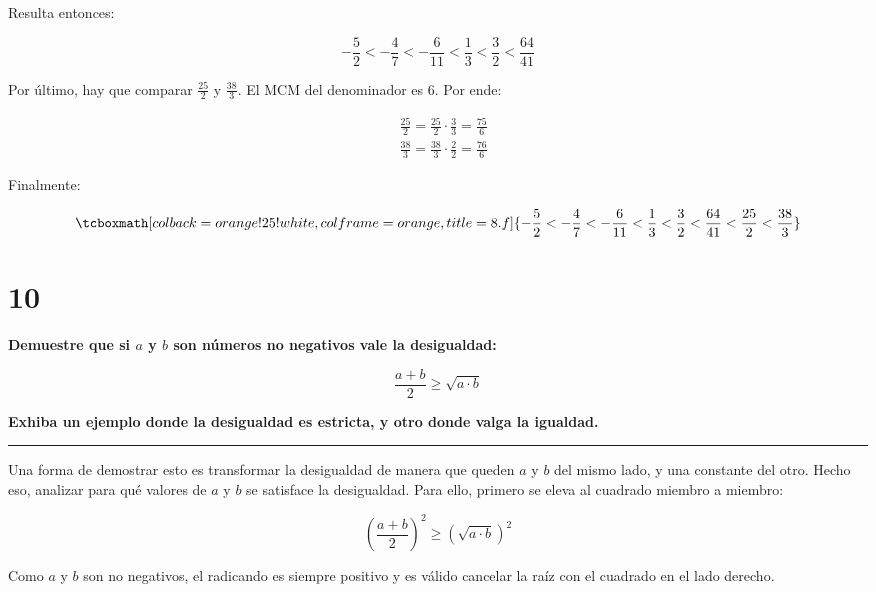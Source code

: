 \documentclass{article}
\newcommand{\hresult}[2]{\tcboxmath[colback=orange!25!white,colframe=orange, title=#1] {#2} }
\begin{document}
Resulta entonces:

\begin{equation}
-\frac{5}{2} < -\frac{4}{7} < -\frac{6}{11} < \frac{1}{3} < \frac{3}{2} < \frac{64}{41}
\end{equation}

Por último, hay que comparar $\frac{25}{2}$ y $\frac{38}{3}$. El MCM del denominador es 6. Por ende:

\begin{subequations} 
\begin{align}
& \frac{25}{2} = \frac{25}{2} \cdot \frac{3}{3} = \frac{75}{6} \\
& \frac{38}{3} = \frac{38}{3} \cdot \frac{2}{2} = \frac{76}{6}
\end{align}
\end{subequations}

Finalmente:

\begin{equation}
\hresult{8.f} { -\frac{5}{2} < -\frac{4}{7} < -\frac{6}{11} < \frac{1}{3} < \frac{3}{2} < \frac{64}{41} < \frac{25}{2} < \frac{38}{3} }
\end{equation}

\section*{10}
\label{sec:10}

\textbf{Demuestre que si $a$ y $b$ son números no negativos vale la desigualdad:}

\begin{equation}
\frac{a+b}{2} \geq \sqrt{a \cdot b}
\end{equation}

\textbf{Exhiba un ejemplo donde la desigualdad es estricta, y otro donde valga la igualdad.}
\vspace{1em}
\hrule
\vspace{1em}

Una forma de demostrar esto es transformar la desigualdad de manera que queden $a$ y $b$ del mismo lado, y una constante del otro. Hecho eso, analizar para qué valores de $a$ y $b$ se satisface la desigualdad. Para ello, primero se eleva al cuadrado miembro a miembro:

\begin{equation}
\left( \frac{a+b}{2} \right)^2 \geq \left( \sqrt{a \cdot b} \right)^2
\end{equation}

Como $a$ y $b$ son no negativos, el radicando es siempre positivo y es válido cancelar la raíz con el cuadrado en el lado derecho.
\end{document}
